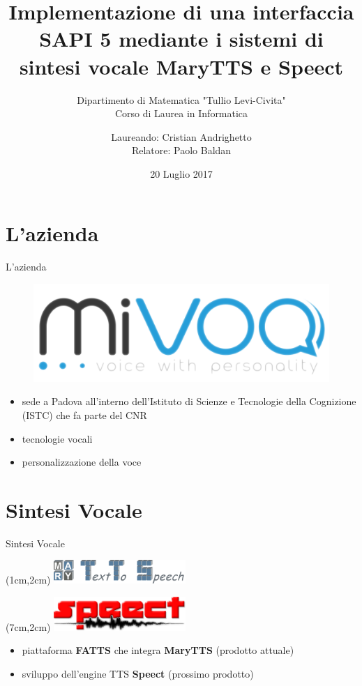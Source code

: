 \documentclass{beamer}
\subtitle{Dipartimento di Matematica "Tullio Levi-Civita"\\
Corso di Laurea in Informatica}
\title{Implementazione di una interfaccia SAPI 5 mediante i sistemi di sintesi vocale MaryTTS e Speect }
\author{Laureando: Cristian Andrighetto\\
		Relatore: Paolo Baldan}
\date{20 Luglio 2017}
\begin{document}
	\maketitle

	\section{L'azienda}

	\begin{frame}{L'azienda}

		\begin{figure}[H]
			\centering
			\includegraphics{images/logo-mivoq.png}
		\end{figure}
	
		\begin{itemize}
			\item sede a Padova all'interno dell'Istituto di Scienze e Tecnologie della Cognizione (ISTC) che fa parte del CNR
			\item tecnologie vocali
			\item personalizzazione della voce
			
		\end{itemize}
	\end{frame}

	\section{Sintesi Vocale}
	
	\begin{frame}{Sintesi Vocale}
		\begin{textblock*}{5cm}(1cm,2cm) %
			\includegraphics[width=5cm]{images/marylogo}
		\end{textblock*}
		\begin{textblock*}{5cm}(7cm,2cm) %
			\includegraphics[width=5cm]{images/speect_logo_full}
		\end{textblock*}
		\begin{itemize}
			\item piattaforma \textbf{FATTS} che integra \textbf{MaryTTS} (prodotto attuale)
			\item sviluppo dell'engine TTS \textbf{Speect} (prossimo prodotto)
		\end{itemize}
	\end{frame}
\end{document}
